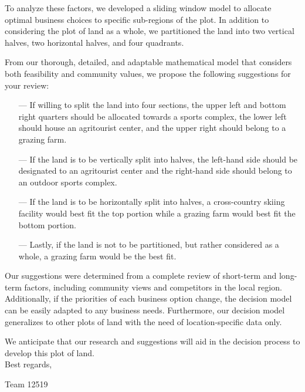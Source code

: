 \documentclass{mcmthesis}
\begin{document}
To analyze these factors, we developed a sliding window model to allocate optimal business choices to specific sub-regions of the plot. In addition to considering the plot of land as a whole, we partitioned the land into two vertical halves, two horizontal halves, and four quadrants.

From our thorough, detailed, and adaptable mathematical model that considers both feasibility and community values,  we propose the following suggestions for your review: 

\begin{enumerate}
\item[---] If willing to split the land into four sections, the upper left and bottom right quarters should be allocated towards a sports complex, the lower left should house an agritourist center, and the upper right should belong to a grazing farm.

\item[---] If the land is to be vertically split into halves, the left-hand side should be designated to an agritourist center and the right-hand side should belong to an outdoor sports complex.

\item[---] If the land is to be horizontally split into halves, a cross-country skiing facility would best fit the top portion while a grazing farm would best fit the bottom portion.

\item[---] Lastly, if the land is not to be partitioned, but rather considered as a whole, a grazing farm would be the best fit. 
\end{enumerate}

Our suggestions were determined from a complete review of short-term and long-term factors, including community views and competitors in the local region. Additionally, if the priorities of each business option change, the decision model can be easily adapted to any business needs. Furthermore, our decision model generalizes to other plots of land with the need of location-specific data only. 

We anticipate that our research and suggestions will aid in the decision process to develop this plot of land.\\


\noindent Best regards,

\noindent Team 12519

\newpage

\tableofcontents
\end{document}
